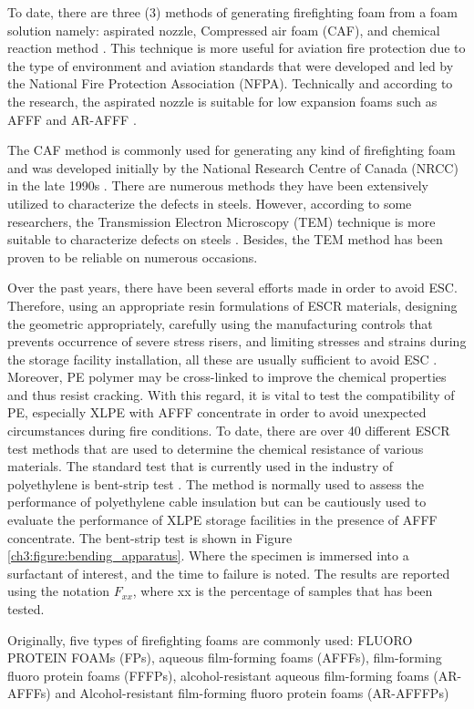 To date, there are three (3) methods of generating firefighting foam from a foam solution namely: aspirated nozzle, Compressed air foam (CAF), and chemical reaction method \cite{laundess2012suppression}. This technique is more useful for aviation fire protection due to the type of environment and aviation standards that were developed and led by the National Fire Protection Association (NFPA). Technically and according to the research, the aspirated nozzle is suitable for low expansion foams such as AFFF and AR-AFFF \cite{xi2017experimental}.

The CAF method is commonly used for generating any kind of firefighting foam and was developed initially by the National Research Centre of Canada (NRCC) in the late 1990s \cite{rie2016class}. There are numerous methods they have been extensively utilized to characterize the defects in steels. However, according to some researchers, the Transmission Electron Microscopy (TEM) technique is more suitable to characterize defects on steels \cite{george2002introduction, bhadeshia2017steels}. Besides, the TEM method has been proven to be reliable on numerous occasions.

Over the past years, there have been several efforts made in order to avoid ESC. Therefore, using an appropriate resin formulations of ESCR materials, designing the geometric appropriately, carefully using the manufacturing controls that prevents occurrence of severe stress risers, and limiting stresses and strains during the storage facility installation, all these are usually sufficient to avoid ESC \cite{gabriel1998history}. Moreover, PE polymer may be cross-linked to improve the chemical properties and thus resist cracking.  With this regard, it is vital to test the compatibility of PE, especially XLPE with AFFF concentrate in order to avoid unexpected circumstances during fire conditions. To date, there are over 40 different ESCR test methods that are used to determine the chemical resistance of various materials. The standard test that is currently used in the industry of polyethylene is bent-strip test \cite{gabriel1998history}. The method is normally used to assess the performance of polyethylene cable insulation but can be cautiously used to evaluate the performance of XLPE storage facilities in the presence of AFFF concentrate. The bent-strip test is shown in Figure \ref{ch3:figure:bending_apparatus}. Where the specimen is immersed into a surfactant of interest, and the time to failure is noted. The results are reported using the notation $F_{xx}$, where xx is the percentage of samples that has been tested.

Originally, five types of firefighting foams are commonly used: FLUORO PROTEIN FOAMs (FPs), aqueous film-forming foams (AFFFs), film-forming fluoro protein foams (FFFPs), alcohol-resistant aqueous film-forming foams (AR-AFFFs) and Alcohol-resistant film-forming fluoro protein foams (AR-AFFFPs)